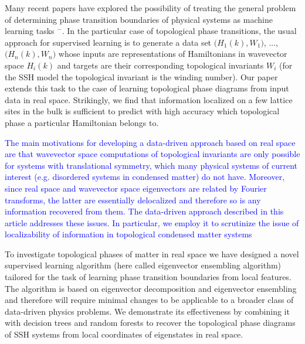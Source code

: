 \documentclass[10pt]{revtex4-1}
\newcommand{\citequote}[1]{\ref{#1}}
\begin{document}
Many recent papers have explored the possibility of treating the general problem of determining phase transition boundaries of physical systems as machine learning tasks \cite{carrasquilla2017machine}$^-$\cite{rodriguez2018identifying}. In the particular case of topological phase transitions, the usual approach for supervised learning is to generate a data set $\big(H_1(k), W_1\big)$, ..., $\big(H_n(k), W_n\big)$ whose inputs are representations of Hamiltonians in wavevector space $H_i(k)$ and targets are their corresponding topological invariants $W_i$ (for the SSH model the topological invariant is the winding number). Our paper extends this task to the case of learning topological phase diagrams from input data in real space. Strikingly, we find that information localized on a few lattice sites in the bulk is sufficient to predict with high accuracy which topological phase a particular Hamiltonian belongs to.

\textcolor{blue}{The main motivations for developing a data-driven approach based on real space are that wavevector space computations of topological invariants are only possible for systems with translational symmetry, which many physical systems of current interest (e.g. disordered systems in condensed matter) do not have. Moreover, since real space and wavevector space eigenvectors are related by Fourier transforms, the latter are essentially delocalized and therefore so is any information recovered from them. The data-driven approach described in this article addresses these issues. In particular, we employ it to scrutinize the issue of localizability of information in topological condensed matter systems} %
 


To investigate topological phases of matter in real space we have designed a novel supervised learning algorithm (here called eigenvector ensembling algorithm) tailored for the task of learning phase transition boundaries from local features. The algorithm is based on eigenvector decomposition and eigenvector ensembling and therefore will require minimal changes to be applicable to a broader class of data-driven physics problems. We demonstrate its effectiveness by combining it with decision trees and random forests to recover the topological phase diagrams of SSH systems from local coordinates of eigenstates in real space.
\end{document}
